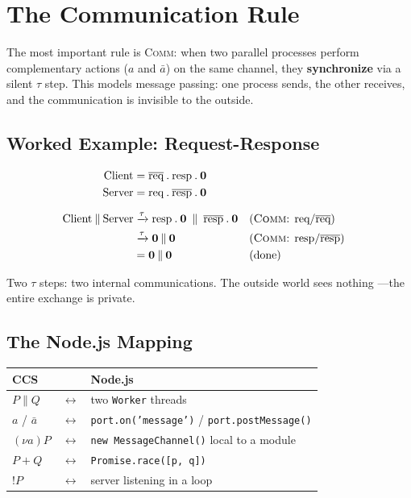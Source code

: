 \documentclass[11pt, a4paper, oneside]{book}
\newcommand{\nil}{\mathbf{0}}
\newcommand{\Par}{\mathbin{\|}}
\newcommand{\pref}{\mathbin{.}}
\newcommand{\res}[1]{(\nu #1)}
\newcommand{\repl}{\mathbin{!}}
\newcommand{\lc}[1]{\texttt{#1}}
\begin{document}
\section{The Communication Rule}

The most important rule is \textsc{Comm}: when two parallel processes perform
complementary actions ($a$ and $\bar{a}$) on the same channel, they
\textbf{synchronize} via a silent $\tau$ step. This models message passing:
one process sends, the other receives, and the communication is invisible to
the outside.

\subsection{Worked Example: Request-Response}

\begin{align*}
  \text{Client} &= \overline{\text{req}} \pref \text{resp} \pref \nil \\
  \text{Server} &= \text{req} \pref \overline{\text{resp}} \pref \nil \\[6pt]
  \text{Client} \Par \text{Server}
  &\xrightarrow{\tau} \text{resp} \pref \nil \;\Par\;
    \overline{\text{resp}} \pref \nil
  &&\text{(\textsc{Comm}: req/}\overline{\text{req}}\text{)} \\
  &\xrightarrow{\tau} \nil \Par \nil
  &&\text{(\textsc{Comm}: resp/}\overline{\text{resp}}\text{)} \\
  &= \nil \Par \nil
  &&\text{(done)}
\end{align*}

Two $\tau$ steps: two internal communications. The outside world sees nothing
---the entire exchange is private.

\subsection{The Node.js Mapping}

\begin{center}
\begin{tabular}{lcl}
  \textbf{CCS} & & \textbf{Node.js} \\
  \midrule
  $P \Par Q$ & $\longleftrightarrow$ & two \lc{Worker} threads \\
  $a$ / $\bar{a}$ & $\longleftrightarrow$ & \lc{port.on('message')} / \lc{port.postMessage()} \\
  $\res{a} P$ & $\longleftrightarrow$ & \lc{new MessageChannel()} local to a module \\
  $P + Q$ & $\longleftrightarrow$ & \lc{Promise.race([p, q])} \\
  $\repl P$ & $\longleftrightarrow$ & server listening in a loop \\
\end{tabular}
\end{center}
\end{document}
